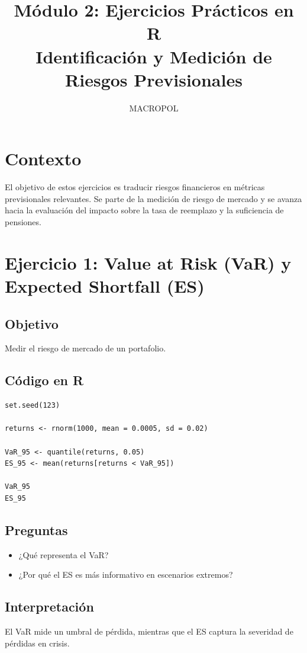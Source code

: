 \documentclass[12pt]{article}
\title{Módulo 2: Ejercicios Prácticos en R\\
Identificación y Medición de Riesgos Previsionales}
\author{MACROPOL}
\date{}
\begin{document}
\maketitle

\section{Contexto}

El objetivo de estos ejercicios es traducir riesgos financieros en métricas previsionales relevantes. Se parte de la medición de riesgo de mercado y se avanza hacia la evaluación del impacto sobre la tasa de reemplazo y la suficiencia de pensiones.

\section{Ejercicio 1: Value at Risk (VaR) y Expected Shortfall (ES)}

\subsection{Objetivo}
Medir el riesgo de mercado de un portafolio.

\subsection{Código en R}
\begin{verbatim}
set.seed(123)

returns <- rnorm(1000, mean = 0.0005, sd = 0.02)

VaR_95 <- quantile(returns, 0.05)
ES_95 <- mean(returns[returns < VaR_95])

VaR_95
ES_95
\end{verbatim}

\subsection{Preguntas}
\begin{itemize}
\item ¿Qué representa el VaR?
\item ¿Por qué el ES es más informativo en escenarios extremos?
\end{itemize}

\subsection{Interpretación}
El VaR mide un umbral de pérdida, mientras que el ES captura la severidad de pérdidas en crisis.
\end{document}
